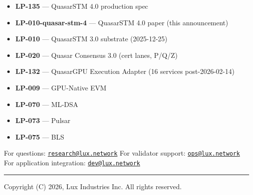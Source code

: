 \documentclass[
]{article}
\providecommand{\tightlist}{%
  \setlength{\itemsep}{0pt}\setlength{\parskip}{0pt}}
\begin{document}
\begin{itemize}
\tightlist
\item
  \textbf{LP-135} --- QuasarSTM 4.0 production spec
\item
  \textbf{LP-010-quasar-stm-4} --- QuasarSTM 4.0 paper (this
  announcement)
\item
  \textbf{LP-010} --- QuasarSTM 3.0 substrate (2025-12-25)
\item
  \textbf{LP-020} --- Quasar Consensus 3.0 (cert lanes, P/Q/Z)
\item
  \textbf{LP-132} --- QuasarGPU Execution Adapter (16 services
  post-2026-02-14)
\item
  \textbf{LP-009} --- GPU-Native EVM
\item
  \textbf{LP-070} --- ML-DSA
\item
  \textbf{LP-073} --- Pulsar
\item
  \textbf{LP-075} --- BLS
\end{itemize}

For questions:
\href{mailto:research@lux.network}{\nolinkurl{research@lux.network}} For
validator support:
\href{mailto:ops@lux.network}{\nolinkurl{ops@lux.network}} For
application integration:
\href{mailto:dev@lux.network}{\nolinkurl{dev@lux.network}}

\begin{center}\rule{0.5\linewidth}{0.5pt}\end{center}

Copyright (C) 2026, Lux Industries Inc. All rights reserved.
\end{document}
